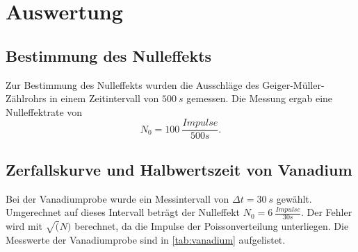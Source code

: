 \section{Auswertung}
\label{sec:Auswertung}

\subsection{Bestimmung des Nulleffekts}\label{sec:Nulleffekt}
Zur Bestimmung des Nulleffekts wurden die Ausschläge des Geiger-Müller-Zählrohrs in einem 
Zeitintervall von $\SI{500}{s}$ gemessen.
Die Messung ergab eine Nulleffektrate von
\begin{equation*}
  N_{0} = \SI{100}{\frac{Impulse}{500s}}.
\end{equation*}

\subsection{Zerfallskurve und Halbwertszeit von Vanadium}
Bei der Vanadiumprobe wurde ein Messintervall von $\Delta t = \SI{30}{s}$ gewählt. Umgerechnet auf dieses
Intervall beträgt der Nulleffekt $N_0 = \SI{6}{\frac{Impulse}{30s}}$. Der Fehler wird mit 
$\sqrt(N)$ berechnet, da die Impulse der Poissonverteilung unterliegen. Die Messwerte der Vanadiumprobe
sind in \autoref{tab:vanadium} aufgelistet.

